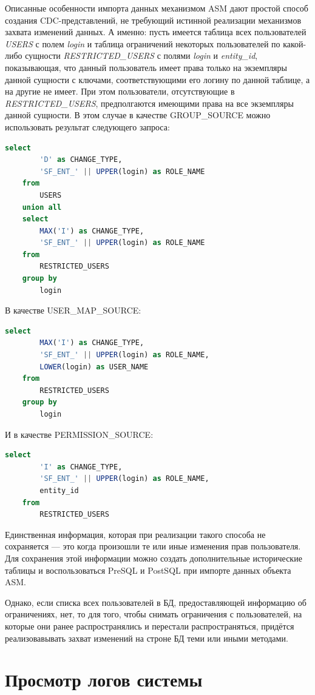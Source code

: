 \documentclass[../user-manual.tex]{subfiles}
\begin{document}
		Описанные особенности импорта данных механизмом ASM дают простой способ создания CDC-представлений, не требующий истинной реализации механизмов захвата изменений данных. А именно: пусть имеется таблица всех пользователей \textit{USERS} с полем \textit{login}	и таблица ограничений некоторых пользователей по какой-либо сущности \textit{RESTRICTED\_USERS} с полями \textit{login} и \textit{entity\_id}, показывающая, что данный пользователь имеет права только на экземпляры данной сущности с ключами, соответствующими его логину по данной таблице, а на другие не имеет. При этом пользователи, отсутствующие в \textit{RESTRICTED\_USERS}, предполгаются имеющими права на все экземпляры данной сущности. В этом случае в качестве GROUP\_SOURCE можно использовать результат следующего запроса:

		\begin{lstlisting}[language=SQL]
	select
		'D' as CHANGE_TYPE,
		'SF_ENT_' || UPPER(login) as ROLE_NAME
	from
		USERS
	union all
	select
		MAX('I') as CHANGE_TYPE,
		'SF_ENT_' || UPPER(login) as ROLE_NAME
	from
		RESTRICTED_USERS
	group by
		login
		\end{lstlisting}

		В качестве USER\_MAP\_SOURCE:
		\begin{lstlisting}[language=SQL]
	select
		MAX('I') as CHANGE_TYPE,
		'SF_ENT_' || UPPER(login) as ROLE_NAME,
		LOWER(login) as USER_NAME
	from
		RESTRICTED_USERS
	group by
		login
	\end{lstlisting}
		И в качестве PERMISSION\_SOURCE:
		\begin{lstlisting}[language=SQL]
	select
		'I' as CHANGE_TYPE,
		'SF_ENT_' || UPPER(login) as ROLE_NAME,
		entity_id
	from
		RESTRICTED_USERS
	\end{lstlisting}		
		
		Единственная информация, которая при реализации такого способа не сохраняется --- это когда произошли те или иные изменения прав пользователя. Для сохранения этой информации можно создать дополнительные исторические таблицы и воспользоваться PreSQL и PostSQL при импорте данных объекта ASM.
		
		Однако, если списка всех пользователей в БД, предоставляющей информацию об ограничениях, нет, то для того, чтобы снимать ограничения с пользователей, на которые они ранее распространялись и перестали распространяться, придётся реализовавывать захват изменений на строне БД теми или иными методами.
	
	\section{Просмотр логов системы}
	
\end{document}
